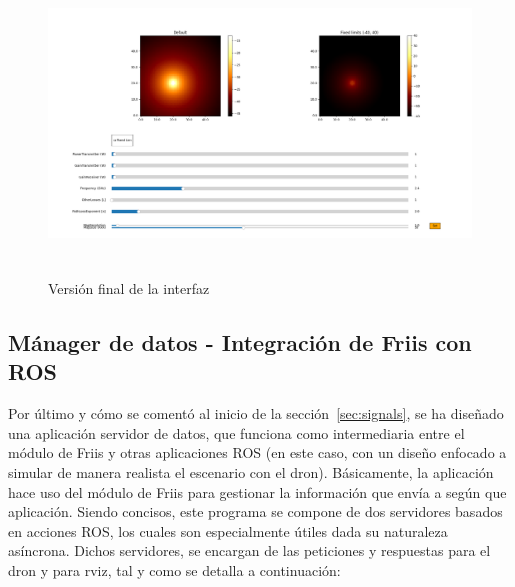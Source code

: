 \begin{figure} [H]
    \begin{center}
    \includegraphics[height=8cm]{imagenes/cap4/7_Friss_endGUI.png}
    \end{center}
	\caption[Versión final de la interfaz]{Versión final de la interfaz}
	\label{fig:friis_end_app}
\end{figure}

\subsection{Mánager de datos - Integración de Friis con \ac{ROS}}
\label{subsec:friis-ros}

Por último y cómo se comentó al inicio de la sección~\ref{sec:signals}, se ha diseñado una aplicación servidor de datos, que funciona como intermediaria entre el módulo de Friis y otras aplicaciones \ac{ROS} (en este caso, con un diseño enfocado a simular de manera realista el escenario con el dron). Básicamente, la aplicación hace uso del módulo de Friis para gestionar la información que envía a según que aplicación. Siendo concisos, este programa se compone de dos servidores basados en acciones \ac{ROS}, los cuales son especialmente útiles dada su naturaleza asíncrona. Dichos servidores, se encargan de las peticiones y respuestas para el dron y para rviz, tal y como se detalla a continuación:

